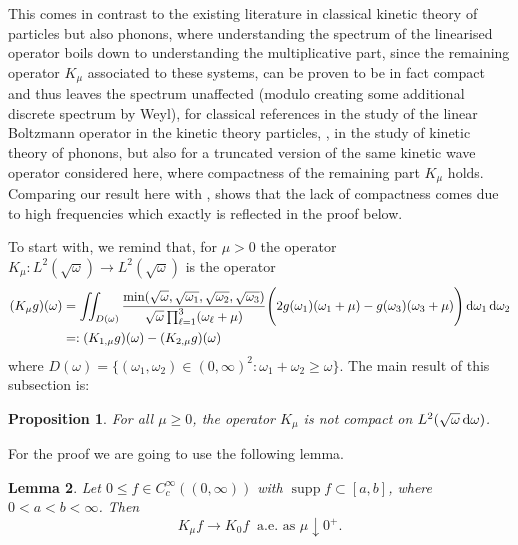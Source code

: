 \documentclass[reqno,11pt,letterpaper]{amsart}
\numberwithin{equation}{section}
\newcommand{\dd}{\, {\rm d}}
\newtheorem{proposition}{Proposition}[section]
\newtheorem{lemma}[proposition]{Lemma}
\begin{document}
This comes in contrast to the existing literature in classical kinetic theory of particles but also phonons, where understanding the spectrum of the linearised operator boils down to understanding the multiplicative part, since the remaining operator $K_\mu$ associated to these systems, can be proven to be in fact compact and thus leaves the spectrum unaffected (modulo creating some additional discrete spectrum by Weyl), \cite{GradUnesco, LaureSR09, Villani_review, cercignani1988, Clement06, Clement07} for classical references in the study of the linear Boltzmann operator in the kinetic theory particles,  \cite{LukkarinenSpohn2008, GerLaMen26, GerLaMen26review}, in the study of kinetic theory of phonons, but also \cite{Men23} for a truncated version of the same kinetic wave operator considered here, where compactness of the remaining part $K_\mu$ holds. Comparing our result here with \cite{Men23}, shows that the lack of compactness comes due to high frequencies which exactly is reflected in the proof below.  

To start with, we remind that, for $\mu>0$ the operator $K_\mu: L^2(\sqrt{\omega}) \to L^2(\sqrt{\omega})$ is the operator 
\begin{align*}
    (K_{\mu} g )(\omega) &= \iint_{D(\omega)} \frac{\operatorname{min}(\sqrt{\omega},\sqrt{\omega_1}, \sqrt{\omega_2}, \sqrt{\omega_3})}{\sqrt{\omega}\prod_{\ell=1}^3 (\omega_\ell+\mu)} \Bigg(2 g(\omega_1) (\omega_1 + \mu)  - g(\omega_3)(\omega_3 + \mu)  \Bigg) \dd \omega_1 \dd \omega_2
\\
& =: (K_{1,\mu}g)(\omega) - (K_{2,\mu}g)(\omega)
\end{align*}
where $D(\omega) = \{(\omega_1, \omega_2) \in (0,\infty)^2: \omega_1+ \omega_2 \geq  \omega\}$. 
The main result of this subsection is: 

\begin{proposition} \label{prop:noncompactness}
  For all $\mu  \geq 0$, the operator $K_\mu$ is not compact on $L^2(\sqrt{\omega} \dd \omega)$.
\end{proposition}

For the proof we are going to use the following lemma.

\begin{lemma}
    Let $0\leq f \in C_c^\infty((0,\infty))$ with $\operatorname{supp}f \subset[a,b]$, where $0<a<b<\infty$. Then $$ K_\mu f \to K_0 f \ \text{ a.e. as } \mu \downarrow 0^+. $$
\end{lemma}
\end{document}
